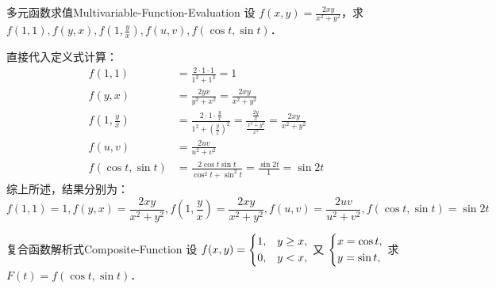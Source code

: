 \begin{problem}{多元函数求值}{Multivariable-Function-Evaluation}
    设 $f(x, y) = \frac{2xy}{x^2+y^2}$，求 $f(1, 1), f(y, x), f(1, \frac{y}{x}), f(u, v), f(\cos t, \sin t)$．
\end{problem}

\begin{solution}
    直接代入定义式计算：
    \begin{equation}
        \begin{aligned}
            f(1, 1)                        & = \frac{2 \cdot 1 \cdot 1}{1^2 + 1^2} = 1                                                                                                     \\
            f(y, x)                        & = \frac{2yx}{y^2 + x^2} = \frac{2xy}{x^2 + y^2}                                                                                               \\
            f\left( 1, \frac{y}{x} \right) & = \frac{2 \cdot 1 \cdot \frac{y}{x}}{1^2 + \left( \frac{y}{x} \right)^2} = \frac{\frac{2y}{x}}{\frac{x^2 + y^2}{x^2}} = \frac{2xy}{x^2 + y^2} \\
            f(u, v)                        & = \frac{2uv}{u^2 + v^2}                                                                                                                       \\
            f(\cos t, \sin t)              & = \frac{2\cos t \sin t}{\cos^2 t + \sin^2 t} = \frac{\sin 2t}{1} = \sin 2t
        \end{aligned}
    \end{equation}
    综上所述，结果分别为：
    \begin{equation}
        \boxed{f(1, 1) = 1, f(y, x) = \frac{2xy}{x^2+y^2}, f\left( 1, \frac{y}{x} \right) = \frac{2xy}{x^2+y^2}, f(u, v) = \frac{2uv}{u^2+v^2}, f(\cos t, \sin t) = \sin 2t}
    \end{equation}
\end{solution}

\begin{problem}{复合函数解析式}{Composite-Function}
    设 $f(x, y) = \begin{dcases} 1, & y \ge x, \\ 0, & y < x, \end{dcases}$ 又 $\begin{dcases} x = \cos t, \\ y = \sin t, \end{dcases}$ 求 $F(t) = f(\cos t, \sin t)$．
\end{problem}

